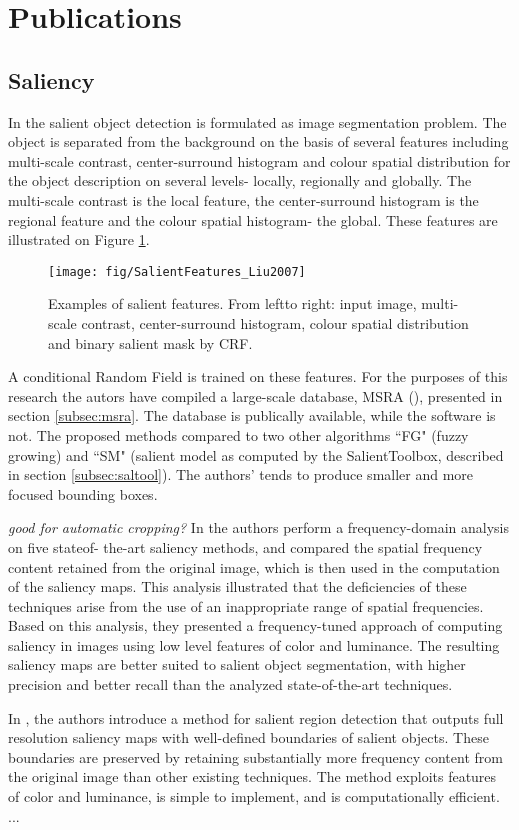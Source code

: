 \section{Publications}
\label{sec:pubs}


\subsection{Saliency}

In \cite{LiuCVPR2007} the salient object detection is formulated as image segmentation problem. The object is separated from the background on the basis of several features including multi-scale contrast, center-surround histogram and colour spatial distribution for the object description on several levels- locally, regionally and globally. The multi-scale contrast is the local feature, the center-surround histogram is the regional feature and the colour spatial histogram- the global. These features are illustrated on Figure \ref{fig:sal_feat_liu07}.
\begin{figure}[H]
\begin{center}
\texttt{[image: fig/SalientFeatures\_Liu2007]}
\end{center}
\caption{Examples of salient features. From leftto right: input image, multi-scale contrast, center-surround histogram, colour spatial distribution and binary salient mask by CRF.}
\label{fig:sal_feat_liu07}
\end{figure}
A conditional Random Field is trained on these features. 
For the purposes of this research the autors have compiled a large-scale database, MSRA (\cite{msra_db}), presented in section \ref{subsec:msra}. The database is publically available, while the software is not. The proposed methods compared to two other algorithms ``FG" (fuzzy growing) and ``SM" (salient model as computed by the SalientToolbox, described in section \ref{subsec:saltool}). The authors' tends to produce smaller and more focused bounding boxes.

{\em good for automatic cropping?}
In \cite{LCAV-CONF-2009-012} the authors perform a frequency-domain analysis on five stateof-
the-art saliency methods, and compared the spatial frequency
content retained from the original image, which is
then used in the computation of the saliency maps. This
analysis illustrated that the deficiencies of these techniques
arise from the use of an inappropriate range of spatial frequencies.
Based on this analysis, they presented a frequency-tuned
approach of computing saliency in images using low
level features of color and luminance. The resulting saliency maps are better suited to salient object segmentation, with higher precision and
better recall than the analyzed state-of-the-art techniques.

In \cite{LCAV-CONF-2009-012}, the authors introduce a method for salient region detection that  outputs full resolution saliency maps with well-defined boundaries of salient objects. These boundaries are  preserved by retaining substantially more frequency  content from the original image than other existing  techniques. The method exploits features of color and luminance, is simple to implement, and is computationally  efficient. ...